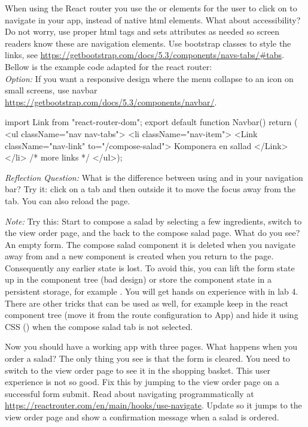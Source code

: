 \documentclass[fleqn, article, a4paper]{memoir}
\begin{document}
\begin{Assignments}
\noindent When using the React router you use the  or  elements for the user to click on to navigate in your app, instead of native  html elements. What about accessibility? Do not worry,  use proper html tags and sets  attributes as needed so screen readers know these are navigation elements. Use bootstrap classes to style the links, see \url{https://getbootstrap.com/docs/5.3/components/navs-tabs/#tabs}. Bellow is the example code adapted for the react router:
\\ \emph{Option:} If you want a responsive design where the menu collapse to an icon on small screens, use navbar \url{https://getbootstrap.com/docs/5.3/components/navbar/}.

\begin{Code}
import { Link } from "react-router-dom";
export default function Navbar() {
  return (
  <ul className="nav nav-tabs">
    <li className="nav-item">
      <Link className="nav-link" to="/compose-salad">
        Komponera en sallad
      </Link>
    </li>
    {/* more links */}
  </ul>);
}
\end{Code}

\noindent \emph{Reflection Question:} What is the difference between using  and  in your navigation bar? Try it: click on a tab and then outside it to move the focus away from the tab. You can also reload the page.

\emph{Note:} Try this: Start to compose a salad by selecting a few ingredients, switch to the view order page, and the back to the compose salad page. What do you see? An empty form. The compose salad component it is deleted when you navigate away from and a new component is created when you return to the page. Consequently any earlier state is lost. To avoid this, you can lift the form state up in the component tree (bad design) or store the component state in a persistent storage, for example . You will get hands on experience with  in lab 4. There are other tricks that can be used as well, for example keep  in the react component tree (move it from the route configuration to App) and hide it using CSS () when the compose salad tab is not selected.

\item Now you should have a working app with three pages. What happens when you order a salad? The only thing you see is that the form is cleared. You need to switch to the view order page to see it in the shopping basket. This user experience is not so good. Fix this by jumping to the view order page on a successful form submit. Read about navigating programmatically at \url{https://reactrouter.com/en/main/hooks/use-navigate}. Update  so it jumps to the view order page and show a confirmation message when a salad is ordered.


\end{Assignments}
\end{document}
